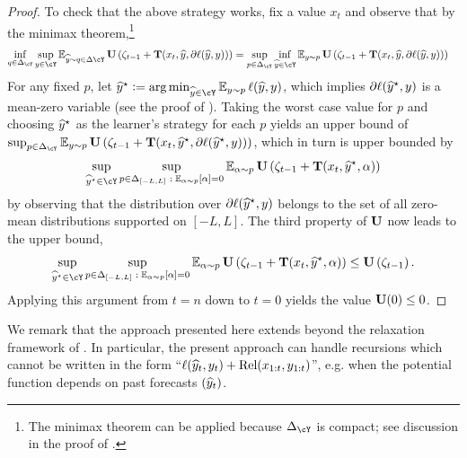 \begin{proof}
To check that the above strategy works, fix a value $x_t$ and observe that by the minimax theorem,\footnote{The minimax theorem can be applied because $\Delta_{\cY}$ is compact; see discussion in the proof of .}
\begin{align*}
\inf_{q\in\Delta_{\cY}} \sup_{y\in\cY} & \En_{\pred \sim q\in\Delta{\cY}} \burk\left(\zeta_{t-1} + \suff(x_t,\pred,\partial \loss(\pred,y))\right) = \sup_{p\in\Delta_{\cY}} \inf_{\pred\in\cY}  \En_{y \sim p} \burk\left(\zeta_{t-1} + \suff(x_t,\pred,\partial \loss(\pred,y))\right)
\end{align*}
For any fixed $p$, let $\pred^{\star} \ldef \argmin_{\pred\in\cY} \En_{y \sim p} \loss(\pred,y)$, which implies $\partial {\ell}({\widehat{y}}^{\star},y)$ is a mean-zero variable (see the proof of ). Taking the worst case value for $p$ and choosing ${\widehat{y}}^{\star}$ as the learner's strategy for each $p$ yields an upper bound of $\sup_{p\in\Delta_{\cY}} \En_{y \sim p} \burk\left(\zeta_{t-1} + \suff(x_t,\pred^{\star},\partial \loss(\pred^{\star},y))\right)$,
which in turn is upper bounded by
\begin{align*}
\sup_{\pred^{\star}\in\cY}\sup_{p\in\Delta_{\brk*{-L,L}} \;:\; \En_{\alpha \sim p}[\alpha]=0}   \En_{\alpha \sim p} \burk\left(\zeta_{t-1} + \suff(x_t,\pred^{\star},\alpha)\right)
\end{align*}
by observing that the distribution over $\partial {\ell}({\widehat{y}}^{\star},y)$ belongs to the set of all zero-mean distributions supported on $[-L,L]$. The third property of $\mathbf{U}$ now leads to the upper bound,
\[
\sup_{\pred^{\star}\in\cY}\sup_{p\in\Delta_{\brk*{-L,L}} \;:\; \En_{\alpha \sim p}[\alpha]=0}   \En_{\alpha \sim p} \burk\left(\zeta_{t-1} + \suff(x_t,\pred^{\star},\alpha)\right) \leq{} \burk\left(\zeta_{t-1}\right).
\]
Applying this argument from $t=n$ down to $t=0$ yields the value $\mathbf{U}(0)\leq 0$.
\end{proof}

We remark that the approach presented here extends beyond the relaxation framework of \citep{rakhlin2012relax}. In particular, the present approach can handle recursions which cannot be written in the form ``${\ell}({\widehat{y}}_t,y_t)+\text{Rel}(x_{1:t},y_{1:t})$'', e.g. when the potential function depends on past forecasts $({\widehat{y}}_t)$.


